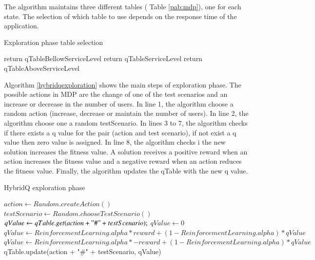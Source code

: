 \documentclass{report}
\begin{document}
The algorithm maintains three different tables ( Table \ref{pab:mdp}), one for each state. The selection of which table to use depends on the response time of the application.

\begin{algorithm}[h]
  \caption{Exploration phase table selection }\label{hybridqexploration}
  \begin{algorithmic}[1]    
    \State return qTableBellowServiceLevel       
    \EndIf
    \State return qTableServiceLevel  
    \EndIf
    \State return qTableAboveServiceLevel  
    \EndIf
  \end{algorithmic}
\end{algorithm}

Algorithm \ref{hybridqexploration} shows the main steps of exploration phase. The possible actions in MDP are the change of one of the test scenarios and an increase or decrease in the number of users. In line 1, the algorithm choose a random action (increase, decrease or maintain the number of users). In line 2, the algorithm choose one a random testScenario. In lines 3 to 7, the algorithm checks if there exists a q value  for the pair (action and test scenario), if not exist a q value then zero value is assigned. In line 8, the algorithm checks i the new solution increases the fitness value. A solution receives a positive reward when an action increases the fitness value and a negative reward when an action reduces the fitness value.  Finally, the algorithm updates the qTable with the new q value.


\begin{algorithm}[h]
  \caption{HybridQ exploration phase }\label{hybridqexploration}
  \begin{algorithmic}[1]    
    \State $action \gets Random.createAction()$
    \State $testScenario \gets Random.chooseTestScenario()$
    \State $ qValue \gets qTable.get(action + "\#" + testScenario);$
    \Else
        \State $ qValue \gets 0$
    \EndIf
     \State $qValue \gets ReinforcementLearning.alpha * reward + (1 - ReinforcementLearning.alpha) * qValue$     
     \Else
          \State $qValue \gets ReinforcementLearning.alpha * -reward + (1 - ReinforcementLearning.alpha) * qValue$     
    \EndIf     
    \State qTable.update(action + "\#" + testScenario, qValue)    
  \end{algorithmic}
\end{algorithm}
\end{document}
